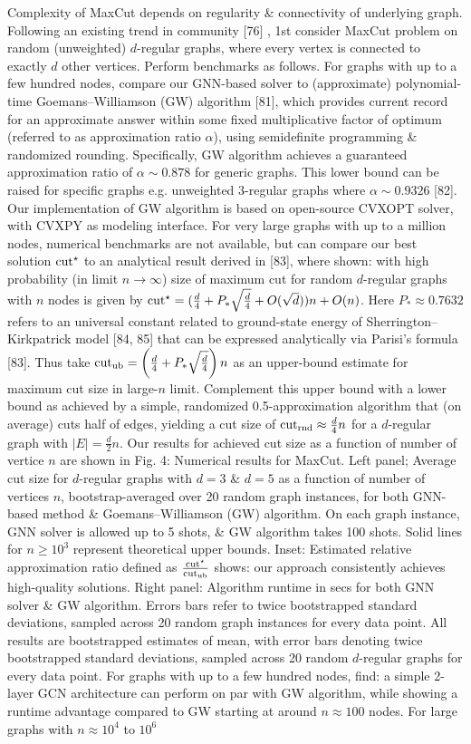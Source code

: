 \documentclass{article}
\begin{document}
\begin{itemize}
    Complexity of MaxCut depends on regularity \& connectivity of underlying graph. Following an existing trend in community [76] , 1st consider MaxCut problem on random (unweighted) $d$-regular graphs, where every vertex is connected to exactly $d$ other vertices. Perform benchmarks as follows. For graphs with up to a few hundred nodes, compare our GNN-based solver to (approximate) polynomial-time Goemans--Williamson (GW) algorithm [81], which provides current record for an approximate answer within some fixed multiplicative factor of optimum (referred to as approximation ratio $\alpha$), using semidefinite programming \& randomized rounding. Specifically, GW algorithm achieves a guaranteed approximation ratio of $\alpha\sim0.878$ for generic graphs. This lower bound can be raised for specific graphs e.g. unweighted 3-regular graphs where $\alpha\sim0.9326$ [82]. Our implementation of GW algorithm is based on open-source CVXOPT solver, with CVXPY as modeling interface. For very large graphs with up to a million nodes, numerical benchmarks are not available, but can compare our best solution ${\rm cut}^\star$ to an analytical result derived in [83], where shown: with high probability (in limit $n\to\infty$) size of maximum cut for random $d$-regular graphs with $n$ nodes is given by ${\rm cut}^\star = (\frac{d}{4} + P_*\sqrt{\frac{d}{4}} + O(\sqrt{d}))n + O(n)$. Here $P_*\approx0.7632$ refers to an universal constant related to ground-state energy of Sherrington--Kirkpatrick model [84, 85] that can be expressed analytically via Parisi's formula [83]. Thus take ${\rm cut}_{\rm ub} = \left(\frac{d}{4} + P_*\sqrt{\frac{d}{4}}\right)n$ as an upper-bound estimate for maximum cut size in large-$n$ limit. Complement this upper bound with a lower bound as achieved by a simple, randomized 0.5-approximation algorithm that (on average) cuts half of edges, yielding a cut size of ${\rm cut}_{\rm rnd}\approx\frac{d}{4}n$ for a $d$-regular graph with $|E| = \frac{d}{2}n$. Our results for achieved cut size as a function of number of vertice $n$ are shown in {\sf Fig. 4: Numerical results for MaxCut. Left panel; Average cut size for $d$-regular graphs with $d = 3$ \& $d = 5$ as a function of number of vertices $n$, bootstrap-averaged over 20 random graph instances, for both GNN-based method \& Goemans--Williamson (GW) algorithm. On each graph instance, GNN solver is allowed up to 5 shots, \& GW algorithm takes 100 shots. Solid lines for $n\ge10^3$ represent theoretical upper bounds. Inset: Estimated relative approximation ratio defined as $\frac{{\rm cut}^\star}{{\rm cut}_{\rm ub}}$ shows: our approach consistently achieves high-quality solutions. Right panel: Algorithm runtime in secs for both GNN solver \& GW algorithm. Errors bars refer to twice bootstrapped standard deviations, sampled across 20 random graph instances for every data point.} All results are bootstrapped estimates of mean, with error bars denoting twice bootstrapped standard deviations, sampled across 20 random $d$-regular graphs for every data point. For graphs with up to a few hundred nodes, find: a simple 2-layer GCN architecture can perform on par with GW algorithm, while showing a runtime advantage compared to GW starting at around $n\approx100$ nodes. For large graphs with $n\approx10^4$ to $10^6$ 
\end{itemize}
\end{document}
